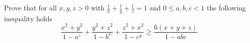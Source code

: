 Prove that for all $x,y,z>0$ with $\frac{1}{x}+\frac{1}{y}+\frac{1}{z}=1$ and $0\leq a,b,c<1$ the following inequality holds\[\frac{x^2+y^2}{1-a^z}+\frac{y^2+z^2}{1-b^x}+\frac{z^2+x^2}{1-c^y}\geq \frac{6(x+y+z)}{1-abc}\]
